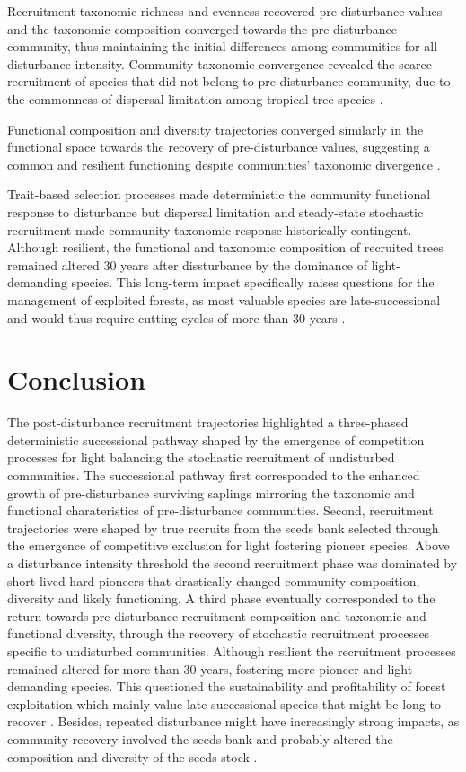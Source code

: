 \documentclass[fleqn,10pt]{ArtEcoFoG} %
\begin{document}
Recruitment taxonomic richness and evenness recovered pre-disturbance
values and the taxonomic composition converged towards the
pre-disturbance community, thus maintaining the initial differences
among communities for all disturbance intensity. Community taxonomic
convergence revealed the scarce recruitment of species that did not
belong to pre-disturbance community, due to the commonness of dispersal
limitation among tropical tree species \citep{Svenning2005}.

Functional composition and diversity trajectories converged similarly in
the functional space towards the recovery of pre-disturbance values,
suggesting a common and resilient functioning despite communities'
taxonomic divergence \citep{Fukami2005}.

Trait-based selection processes made deterministic the community
functional response to disturbance but dispersal limitation and
steady-state stochastic recruitment made community taxonomic response
historically contingent. Although resilient, the functional and
taxonomic composition of recruited trees remained altered 30 years after
dissturbance by the dominance of light-demanding species. This long-term
impact specifically raises questions for the management of exploited
forests, as most valuable species are late-successional and would thus
require cutting cycles of more than 30 years \citep{Putz2012}.

\section{Conclusion}\label{conclusion}

The post-disturbance recruitment trajectories highlighted a three-phased
deterministic successional pathway shaped by the emergence of
competition processes for light balancing the stochastic recruitment of
undisturbed communities. The successional pathway first corresponded to
the enhanced growth of pre-disturbance surviving saplings mirroring the
taxonomic and functional charateristics of pre-disturbance communities.
Second, recruitment trajectories were shaped by true recruits from the
seeds bank selected through the emergence of competitive exclusion for
light fostering pioneer species. Above a disturbance intensity threshold
the second recruitment phase was dominated by short-lived hard pioneers
that drastically changed community composition, diversity and likely
functioning. A third phase eventually corresponded to the return towards
pre-disturbance recruitment composition and taxonomic and functional
diversity, through the recovery of stochastic recruitment processes
specific to undisturbed communities. Although resilient the recruitment
processes remained altered for more than 30 years, fostering more
pioneer and light-demanding species. This questioned the sustainability
and profitability of forest exploitation which mainly value
late-successional species that might be long to recover
\citep{Putz2012}. Besides, repeated disturbance might have increasingly
strong impacts, as community recovery involved the seeds bank and
probably altered the composition and diversity of the seeds stock
\citep{Norden2009}.
\end{document}

